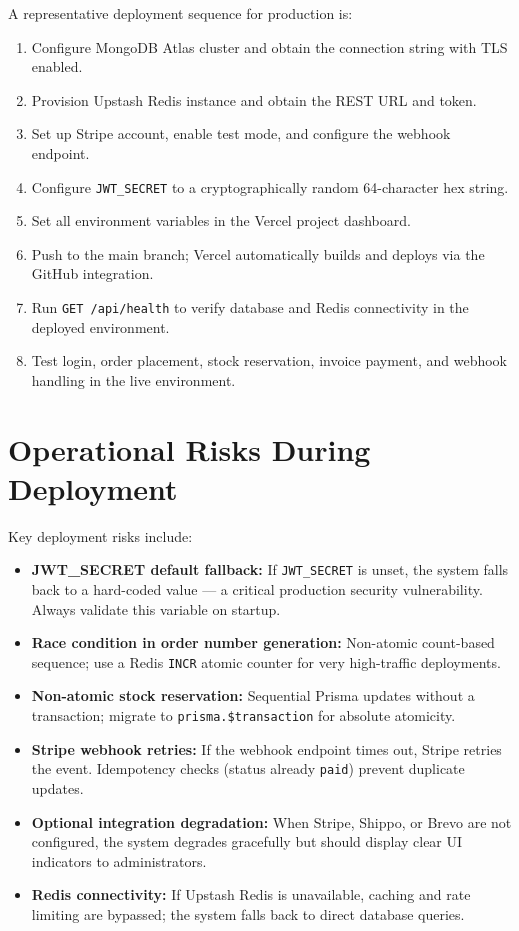 \documentclass[12pt,a4paper]{report}
\begin{document}
A representative deployment sequence for production is:
\begin{enumerate}
    \item Configure MongoDB Atlas cluster and obtain the connection string with TLS enabled.
    \item Provision Upstash Redis instance and obtain the REST URL and token.
    \item Set up Stripe account, enable test mode, and configure the webhook endpoint.
    \item Configure \texttt{JWT\_SECRET} to a cryptographically random 64-character hex string.
    \item Set all environment variables in the Vercel project dashboard.
    \item Push to the main branch; Vercel automatically builds and deploys via the GitHub integration.
    \item Run \texttt{GET /api/health} to verify database and Redis connectivity in the deployed environment.
    \item Test login, order placement, stock reservation, invoice payment, and webhook handling in the live environment.
\end{enumerate}

\section{Operational Risks During Deployment}

Key deployment risks include:
\begin{itemize}
    \item \textbf{JWT\_SECRET default fallback:} If \texttt{JWT\_SECRET} is unset, the system falls back to a hard-coded value --- a critical production security vulnerability. Always validate this variable on startup.
    \item \textbf{Race condition in order number generation:} Non-atomic count-based sequence; use a Redis \texttt{INCR} atomic counter for very high-traffic deployments.
    \item \textbf{Non-atomic stock reservation:} Sequential Prisma updates without a transaction; migrate to \texttt{prisma.\$transaction} for absolute atomicity.
    \item \textbf{Stripe webhook retries:} If the webhook endpoint times out, Stripe retries the event. Idempotency checks (status already \texttt{paid}) prevent duplicate updates.
    \item \textbf{Optional integration degradation:} When Stripe, Shippo, or Brevo are not configured, the system degrades gracefully but should display clear UI indicators to administrators.
    \item \textbf{Redis connectivity:} If Upstash Redis is unavailable, caching and rate limiting are bypassed; the system falls back to direct database queries.
\end{itemize}
\end{document}
